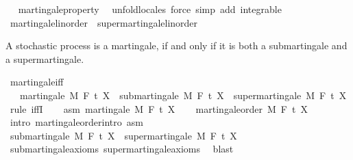 \begin{isabellebody}
\isadelimproof
\ %
\endisadelimproof
%
\isatagproof
{}\isamarkupfalse%
\ martingale{\isacharunderscore}{\kern0pt}property\ \isamarkupfalse%
\ {\isacharparenleft}{\kern0pt}unfold{\isacharunderscore}{\kern0pt}locales{\isacharparenright}{\kern0pt}\ {\isacharparenleft}{\kern0pt}force\ simp\ add{\isacharcolon}{\kern0pt}\ integrable{\isacharparenright}{\kern0pt}{\isacharplus}{\kern0pt}%
\endisatagproof
{\isafoldproof}%
%
\isadelimproof
%
\endisadelimproof
\isanewline
{}\isamarkupfalse%
\ martingale{\isacharunderscore}{\kern0pt}linorder\ {\isasymsubseteq}\ supermartingale{\isacharunderscore}{\kern0pt}linorder%
\isadelimproof
\ %
\endisadelimproof
%
\isatagproof
\isacommand{{\isachardot}{\kern0pt}{\isachardot}{\kern0pt}}\isamarkupfalse%
%
\endisatagproof
{\isafoldproof}%
%
\isadelimproof
%
\endisadelimproof
%
\begin{isamarkuptext}%
A stochastic process is a martingale, if and only if it is both a submartingale and a supermartingale.%
\end{isamarkuptext}\isamarkuptrue%
\isamarkupfalse%
\ martingale{\isacharunderscore}{\kern0pt}iff{\isacharcolon}{\kern0pt}\ \isanewline
\ \ \ {\isachardoublequoteopen}martingale\ M\ F\ t\ X\ {\isasymlongleftrightarrow}\ submartingale\ M\ F\ t\ X\ {\isasymand}\ supermartingale\ M\ F\ t\ X{\isachardoublequoteclose}\isanewline
%
\isadelimproof
%
\endisadelimproof
%
\isatagproof
{}\isamarkupfalse%
\ {\isacharparenleft}{\kern0pt}rule\ iffI{\isacharparenright}{\kern0pt}\isanewline
\ \ \isamarkupfalse%
\ asm{\isacharcolon}{\kern0pt}\ {\isachardoublequoteopen}martingale\ M\ F\ t\ X{\isachardoublequoteclose}\isanewline
\ \ \isamarkupfalse%
\ martingale{\isacharunderscore}{\kern0pt}order\ M\ F\ t\ X\ \isamarkupfalse%
\ {\isacharparenleft}{\kern0pt}intro\ martingale{\isacharunderscore}{\kern0pt}order{\isachardot}{\kern0pt}intro\ asm{\isacharparenright}{\kern0pt}\isanewline
\ \ \isamarkupfalse%
\ {\isachardoublequoteopen}submartingale\ M\ F\ t\ X\ {\isasymand}\ supermartingale\ M\ F\ t\ X{\isachardoublequoteclose}\ \isamarkupfalse%
\ submartingale{\isacharunderscore}{\kern0pt}axioms\ supermartingale{\isacharunderscore}{\kern0pt}axioms\ \isamarkupfalse%
\ blast\isanewline
{}\isamarkupfalse%

\end{isabellebody}
